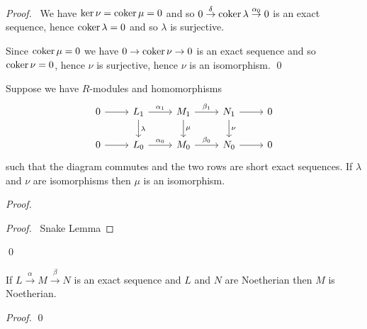\begin{proof}
\pf\ We have $\ker \nu = \operatorname{coker} \mu = 0$ and so $0 \stackrel{\delta}{\rightarrow} \operatorname{coker} \lambda \stackrel{\alpha_0}{\rightarrow} 0$ is an exact sequence, hence $\operatorname{coker} \lambda = 0$ and so $\lambda$ is surjective.

Since $\operatorname{coker} \mu = 0$ we have $0 \rightarrow \operatorname{coker} \nu \rightarrow 0$ is an exact sequence and so $\operatorname{coker} \nu = 0$, hence $\nu$ is surjective, hence $\nu$ is an isomorphism. \qed
\end{proof}

\begin{prop}
Suppose we have $R$-modules and homomorphisms
\[ \begin{tikzcd}
0 \arrow[r] & L_1 \arrow[r,"\alpha_1"] \arrow[d,"\lambda"] & M_1 \arrow[r,"\beta_1"] \arrow[d,"\mu"] & N_1 \arrow[r] \arrow[d,"\nu"] & 0 \\
0 \arrow[r] & L_0 \arrow[r,"\alpha_0"] & M_0 \arrow[r,"\beta_0"] & N_0 \arrow[r] & 0
\end{tikzcd} \]
such that the diagram commutes and the two rows are short exact sequences. If $\lambda$ and $\nu$ are isomorphisms then $\mu$ is an isomorphism.
\end{prop}

\begin{proof}
\pf
{}
\begin{proof}
	\pf\ Snake Lemma
\end{proof}
\qed
\end{proof}

\begin{prop}
If $L \stackrel{\alpha}{\rightarrow} M \stackrel{\beta}{\rightarrow} N$ is an exact sequence and $L$ and $N$ are Noetherian then $M$ is Noetherian.
\end{prop}

\begin{proof}
\pf
{}
\qed
\end{proof}

